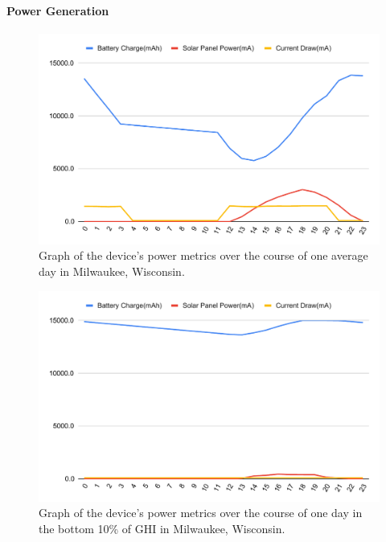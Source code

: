 \documentclass[fleqn,10pt]{SelfArx} %
\begin{document}
	\paragraph*{Power Generation}
	
	\begin{figure}[h]
		\centering
		\includegraphics[width=1\linewidth]{Figures/MedDay}
		\caption[Power Consumption Graph]{Graph of the device's power metrics over the course of one average day in Milwaukee, Wisconsin.}
		\label{fig:ElecMod}
	\end{figure} 
	
	\begin{figure}[h]
		\centering
		\includegraphics[width=1\linewidth]{Figures/LowDay}
		\caption[Power Consumption Graph]{Graph of the device's power metrics over the course of one day in the bottom 10\% of GHI in Milwaukee, Wisconsin.}
		\label{fig:botPowerGen}
	\end{figure} 
	
\end{document}
